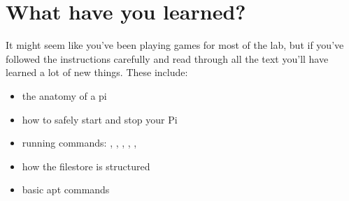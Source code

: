 \FloatBarrier
\section{What have you learned?}

It might seem like you've been playing games for most of the lab, but if you've followed the instructions carefully and read through all the text you'll have learned a lot of new things. These include:
\begin{itemize}
\item the anatomy of a pi
\item how to safely start and stop your Pi
\item running commands: , , , , , 
\item how the filestore is structured
\item basic apt commands
\end{itemize}





